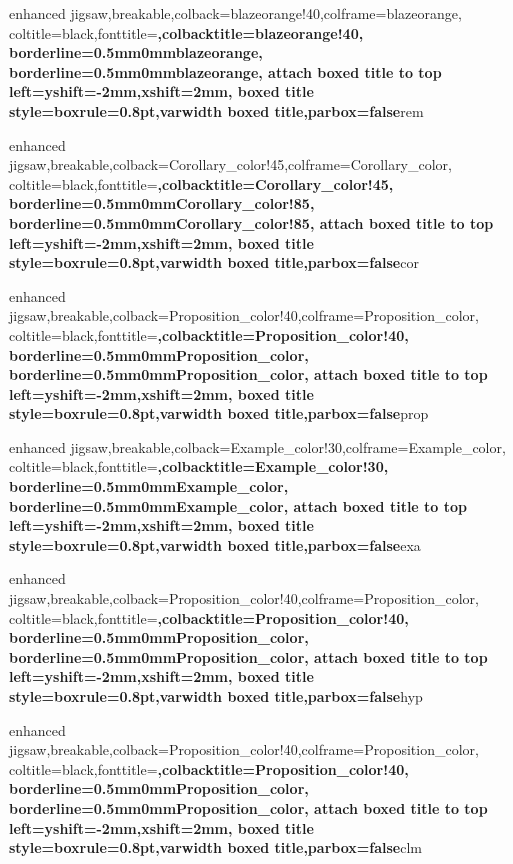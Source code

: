 {enhanced jigsaw,breakable,colback=blazeorange!40,colframe=blazeorange,
coltitle=black,fonttitle=\bfseries ,colbacktitle=blazeorange!40,
borderline={0.5mm}{0mm}{blazeorange},
borderline={0.5mm}{0mm}{blazeorange},
attach boxed title to top left={yshift=-2mm,xshift=2mm},
boxed title style={boxrule=0.8pt},varwidth boxed title,parbox=false}{rem}



{enhanced jigsaw,breakable,colback=Corollary_color!45,colframe=Corollary_color,
coltitle=black,fonttitle=\bfseries ,colbacktitle=Corollary_color!45,
borderline={0.5mm}{0mm}{Corollary_color!85},
borderline={0.5mm}{0mm}{Corollary_color!85},
attach boxed title to top left={yshift=-2mm,xshift=2mm},
boxed title style={boxrule=0.8pt},varwidth boxed title,parbox=false}{cor}



{enhanced jigsaw,breakable,colback=Proposition_color!40,colframe=Proposition_color,
coltitle=black,fonttitle=\bfseries ,colbacktitle=Proposition_color!40,
borderline={0.5mm}{0mm}{Proposition_color},
borderline={0.5mm}{0mm}{Proposition_color},
attach boxed title to top left={yshift=-2mm,xshift=2mm},
boxed title style={boxrule=0.8pt},varwidth boxed title,parbox=false}{prop}



{enhanced jigsaw,breakable,colback=Example_color!30,colframe=Example_color,
coltitle=black,fonttitle=\bfseries ,colbacktitle=Example_color!30,
borderline={0.5mm}{0mm}{Example_color},
borderline={0.5mm}{0mm}{Example_color},
attach boxed title to top left={yshift=-2mm,xshift=2mm},
boxed title style={boxrule=0.8pt},varwidth boxed title,parbox=false}{exa}


{enhanced jigsaw,breakable,colback=Proposition_color!40,colframe=Proposition_color,
coltitle=black,fonttitle=\bfseries ,colbacktitle=Proposition_color!40,
borderline={0.5mm}{0mm}{Proposition_color},
borderline={0.5mm}{0mm}{Proposition_color},
attach boxed title to top left={yshift=-2mm,xshift=2mm},
boxed title style={boxrule=0.8pt},varwidth boxed title,parbox=false}{hyp}

{enhanced jigsaw,breakable,colback=Proposition_color!40,colframe=Proposition_color,
coltitle=black,fonttitle=\bfseries ,colbacktitle=Proposition_color!40,
borderline={0.5mm}{0mm}{Proposition_color},
borderline={0.5mm}{0mm}{Proposition_color},
attach boxed title to top left={yshift=-2mm,xshift=2mm},
boxed title style={boxrule=0.8pt},varwidth boxed title,parbox=false}{clm}


